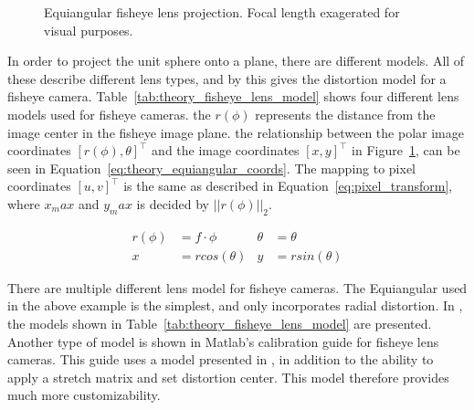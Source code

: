 \begin{figure}[!htb]
    
    \caption{Equiangular fisheye lens projection. Focal length exagerated for visual purposes.}
    \label{fig:fisheye_spherical_projection}
\end{figure}

In order to project the unit sphere onto a plane, there are different models. All of these describe different lens types, and by this gives the distortion model for a fisheye camera. Table~\ref{tab:theory_fisheye_lens_model} shows four different lens models used for fisheye cameras. the $r(\phi)$ represents the distance from the image center in the fisheye image plane. the relationship between the polar image coordinates $[r(\phi), \theta]^\top$ and the image coordinates $[x,y]^\top$ in Figure~\ref{fig:fisheye_spherical_projection}, can be seen in Equation~\eqref{eq:theory_equiangular_coords}. The mapping to pixel coordinates $[u,v]^\top$ is the same as described in Equation~\eqref{eq:pixel_transform}, where $x_max$ and $y_max$ is decided by $||r(\phi)||_2$.

\begin{align}
    r(\phi) &= f \cdot \phi & \theta &= \theta \nonumber \\
    x &= rcos(\theta) & y &= rsin(\theta)
    \label{eq:theory_equiangular_coords}
\end{align}

There are multiple different lens model for fisheye cameras. The Equiangular used in the above example is the simplest, and only incorporates radial distortion. In \cite{FisheyeCorke}, the models shown in Table~\ref{tab:theory_fisheye_lens_model} are presented. Another type of model is shown in Matlab's calibration guide for fisheye lens cameras\cite{MatlabFish}. This guide uses a model presented in \cite{FisheyeKalibration}, in addition to the ability to apply a stretch matrix and set distortion center. This model therefore provides much more customizability.

